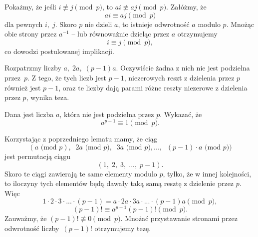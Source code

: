 
\noindent
Pokażmy, że jeśli $i \not\equiv j \pmod{p}$, to $ai \not\equiv aj \pmod{p}$. 
Załóżmy, że 
\[
    ai \equiv aj \pmod{p}
\] 
dla pewnych $i,\; j$. Skoro $p$ nie dzieli $a$, to istnieje odwrotność $a$ modulo $p$. Mnożąc obie strony przez $a^{-1}$ -- lub równoważnie dzieląc przez $a$ otrzymujemy
\[
    i \equiv j \pmod{p},
\]
co dowodzi postulowanej implikacji.

Rozpatrzmy liczby $a, \; 2a,\; (p - 1)a$. Oczywiście żadna z nich nie jest podzielna przez~$p$. Z tego, że tych liczb jest $p - 1$, niezerowych reszt z dzielenia przez $p$ również jest $p - 1$, oraz te liczby dają parami różne reszty niezerowe z dzielenia przez $p$, wynika teza.

\newpage


\noindent
Dana jest liczba $a$, która nie jest podzielna przez $p$. Wykazać, że
\[
    a^{p - 1} \equiv 1 \pmod{p}.
\]


\noindent
Korzystając z poprzedniego lematu mamy, że ciąg
\[
    (a \text{ (mod } p),\;\; 2a \text{ (mod } p),\;\;  3a \text{ (mod } p), ...,\;\;  (p - 1) \cdot a \text{ (mod } p))
\]
jest permutacją ciągu
\[
 (1,\; 2,\; 3,\; ...,\; p - 1).
\]
Skoro te ciągi zawierają te same elementy modulo $p$, tylko, że w innej kolejności, to iloczyny tych elementów będą dawały taką samą resztę z dzielenie przez $p$. Więc
\[
    1 \cdot 2 \cdot 3 \cdot ... \cdot (p - 1) = a \cdot 2a \cdot 3a \cdot ... \cdot (p - 1)a \pmod{p},
\]
\[
    (p - 1)! \equiv a^{p - 1}(p - 1)! \pmod{p}.
\]
Zauważmy, że $(p - 1)! \not\equiv 0 \pmod{p}$. Mnożać przystawanie stronami przez odwrotność liczby~$(p - 1)!$ otrzymujemy tezę.

\vspace{10px}
